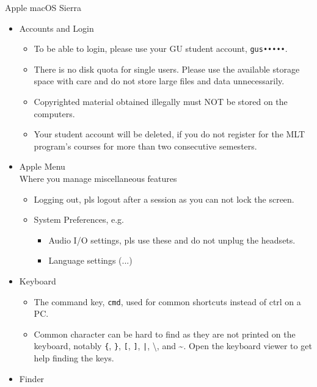 \documentclass[a4,landscape]{seminar}
\begin{document}
\begin{slide}
  {\Large Apple macOS Sierra}
  \begin{itemize}
  \item Accounts and Login
    \begin{itemize}
    \item To be able to login, please use your GU student account, \texttt{gus•••••}.
    \item There is no disk quota for single users. Please use the
      available storage space with
      care and do not store large files and data unnecessarily.
    \item Copyrighted material obtained illegally must NOT be stored
      on the computers.
    \item Your student account will be deleted, if you do not register
      for the MLT program's courses for more than two consecutive semesters.
    \end{itemize}
  \item Apple Menu\\[1ex]
    Where you manage miscellaneous features
    \begin{itemize}
    \item Logging out, pls logout after a session as you can not lock the screen.
    \item System Preferences, e.g.
      \begin{itemize}
      \item Audio I/O settings, pls use these and do not unplug the headsets.
      \item Language settings (...)
      \end{itemize}
    \end{itemize}
  \end{itemize}
  \clearpage{}
  \begin{itemize}
  \item Keyboard
    \begin{itemize}
    \item The command key, \texttt{cmd}, used for common shortcuts instead of %
      ctrl on a PC.
    \item Common character can be hard to find as they are not printed
      on the keyboard, notably \texttt{\{}, \texttt{\}}, \texttt{[}, \texttt{]}, \texttt{|}, \textbackslash, and \textasciitilde. Open the keyboard viewer to get help finding the keys.
    \end{itemize}
  \item Finder\\[1ex]

\end{itemize}
\end{slide}
\end{document}
